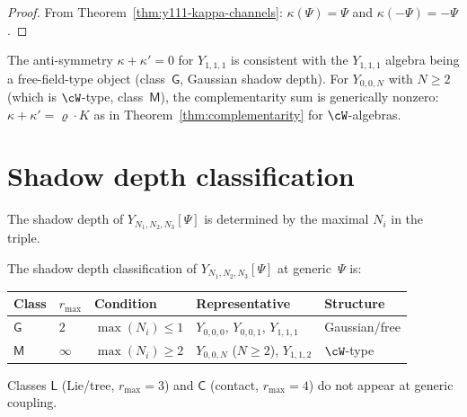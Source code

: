 \begin{proof}
From Theorem~\ref{thm:y111-kappa-channels}:
$\kappa(\Psi) = \Psi$ and $\kappa(-\Psi) = -\Psi$.
\end{proof}

\begin{remark}[Complementarity sum and the antisymmetry $\kappa+\kappa'=0$]%
\label{rem:y-complementarity-level}
The anti-symmetry $\kappa + \kappa' = 0$ for $Y_{1,1,1}$ is
consistent with the $Y_{1,1,1}$ algebra being a free-field-type
object (class~$\mathsf{G}$, Gaussian shadow depth). For
$Y_{0,0,N}$ with $N \geq 2$ (which is $\cW$-type, class~$\mathsf{M}$),
the complementarity sum is generically nonzero:
$\kappa + \kappa' = \varrho \cdot K$ as in
Theorem~\ref{thm:complementarity} for $\cW$-algebras.
\end{remark}


\section{Shadow depth classification}%
\label{sec:y-shadow-depth}

The shadow depth of $Y_{N_1,N_2,N_3}[\Psi]$ is determined by
the maximal $N_i$ in the triple.

\begin{theorem}%
\label{thm:y-shadow-depth}
The shadow depth classification of $Y_{N_1,N_2,N_3}[\Psi]$
at generic~$\Psi$ is:
\begin{center}
\begin{tabular}{lllll}
\toprule
\textbf{Class} & $r_{\max}$ & \textbf{Condition}
 & \textbf{Representative} & \textbf{Structure} \\
\midrule
$\mathsf{G}$ & $2$ &
 $\max(N_i) \leq 1$ &
 $Y_{0,0,0}$, $Y_{0,0,1}$, $Y_{1,1,1}$ &
 Gaussian/free \\
$\mathsf{M}$ & $\infty$ &
 $\max(N_i) \geq 2$ &
 $Y_{0,0,N}$ ($N \geq 2$), $Y_{1,1,2}$ &
 $\cW$-type \\
\bottomrule
\end{tabular}
\end{center}
Classes $\mathsf{L}$ \textup{(}Lie/tree, $r_{\max} = 3$\textup{)}
and $\mathsf{C}$ \textup{(}contact, $r_{\max} = 4$\textup{)} do
not appear at generic coupling.
\end{theorem}

